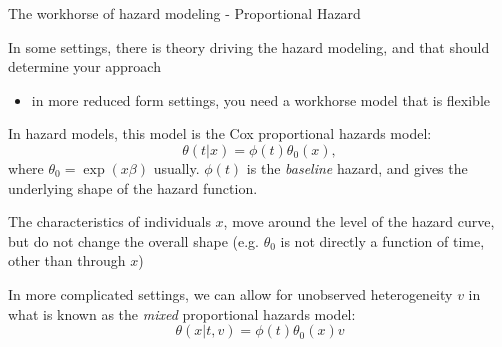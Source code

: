 \documentclass[notes,11pt, aspectratio=169]{beamer}
\newenvironment{wideitemize}{\itemize\addtolength{\itemsep}{10pt}}{\enditemize}
\begin{document}
\begin{frame}{The workhorse of hazard modeling - Proportional Hazard}
  \begin{wideitemize}
  \item In some settings, there is theory driving the hazard
    modeling, and that should determine your approach
    \begin{itemize}
    \item in more reduced form settings, you need a workhorse model that
      is flexible
    \end{itemize}
  \item In hazard models, this model is the Cox proportional hazards model:
    \begin{equation}
      \theta(t | x) = \phi(t) \theta_{0}(x) , 
    \end{equation}
    where $\theta_{0} = \exp(x\beta)$ usually. $\phi(t)$ is the
    \emph{baseline} hazard, and gives the underlying shape of the
    hazard function.
  \item The characteristics of individuals $x$, move around the
    level of the hazard curve, but do not change the overall shape
    (e.g. $\theta_{0}$ is not directly a function of time, other
    than through $x$)
  \item In more complicated settings, we can allow for unobserved
    heterogeneity $v$ in what is known as the \emph{mixed} proportional
    hazards model:
    \begin{equation}
      \theta(x|t, v) = \phi(t) \theta_{0}(x) v
    \end{equation}
    
  \end{wideitemize}
\end{frame}
\end{document}
